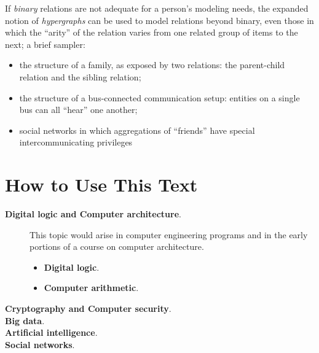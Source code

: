 \medskip

If {\em binary} relations are not adequate for a person's modeling
needs, the expanded notion of {\em hypergraphs} can be used to model
relations beyond binary, even those in which the ``arity'' of the
relation varies from one related group of items to the next; a brief
sampler:
\begin{itemize}
\item
the structure of a family, as exposed by two relations: the
parent-child relation and the sibling relation;
\item
the structure of a bus-connected communication setup: entities on a
single bus can all ``hear'' one another;
\item
social networks in which aggregations of ``friends'' have special
intercommunicating privileges
\end{itemize}


\section{How to Use This Text}
\label{sec:how-to-use}

\begin{description}
\item[{\bf Digital logic and Computer architecture}.]
 
This topic would arise in computer engineering programs and in the
early portions of a course on computer architecture.
\begin{itemize}
\item
{\bf Digital logic}. 
\item
{\bf Computer arithmetic}.  
\end{itemize}

\item[{\bf Cryptography and Computer security}.]


\item[{\bf Big data}.]


\item[{\bf Artificial intelligence}.]


\item[{\bf Social networks}.]

\end{description}






